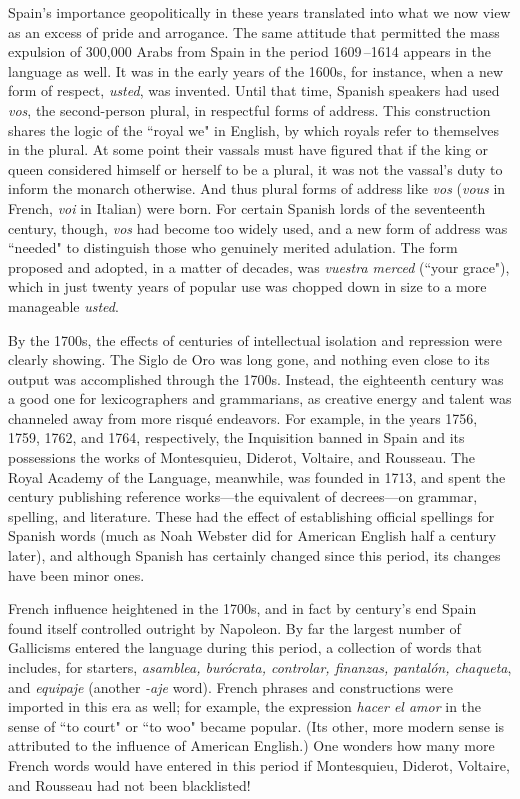 Spain's importance geopolitically in these years translated into
what we now view as an excess of pride and arrogance. The same attitude that permitted the mass expulsion of 300,000 Arabs from Spain
in the period 1609\,--1614 appears in the language as well. It was in
the early years of the 1600s, for instance, when a new form of respect,
\emph{usted}, was invented. Until that time, Spanish speakers had used \emph{vos},
the second-person plural, in respectful forms of address. This construction shares the logic of the ``royal we" in English, by which royals refer to themselves in the plural. At some point their vassals must have
figured that if the king or queen considered himself or herself to be a
plural, it was not the vassal's duty to inform the monarch otherwise.
And thus plural forms of address like \emph{vos} (\emph{vous} in French, \emph{voi} in Italian) were born. For certain Spanish lords of the seventeenth century,
though, \emph{vos} had become too widely used, and a new form of address
was ``needed" to distinguish those who genuinely merited adulation.
The form proposed and adopted, in a matter of decades, was \emph{vuestra
	merced} (``your grace"), which in just twenty years of popular use was
chopped down in size to a more manageable \emph{usted}.

By the 1700s, the effects of centuries of intellectual isolation
and repression were clearly showing. The Siglo de Oro was long gone,
and nothing even close to its output was accomplished through the
1700s. Instead, the eighteenth century was a good one for lexicographers and grammarians, as creative energy and talent was channeled
away from more risqué endeavors. For example, in the years 1756,
1759, 1762, and 1764, respectively, the Inquisition banned in Spain and
its possessions the works of Montesquieu, Diderot, Voltaire, and Rousseau. The Royal Academy of the Language, meanwhile, was founded in
1713, and spent the century publishing reference works---the equivalent of decrees---on grammar, spelling, and literature. These had the
effect of establishing official spellings for Spanish words (much as
Noah Webster did for American English half a century later), and although Spanish has certainly changed since this period, its changes
have been minor ones.

French influence heightened in the 1700s, and in fact by century's end Spain found itself controlled outright by Napoleon. By far
the largest number of Gallicisms entered the language during this period, a collection of words that includes, for starters, \emph{asamblea, burócrata, controlar, finanzas, pantalón, chaqueta}, and \emph{equipaje} (another
\emph{-aje} word). French phrases and constructions were imported in this era
as well; for example, the expression \emph{hacer el amor} in the sense of ``to
court" or ``to woo" became popular. (Its other, more modern sense is
attributed to the influence of American English.) One wonders how
many more French words would have entered in this period if Montesquieu, Diderot, Voltaire, and Rousseau had not been blacklisted!

